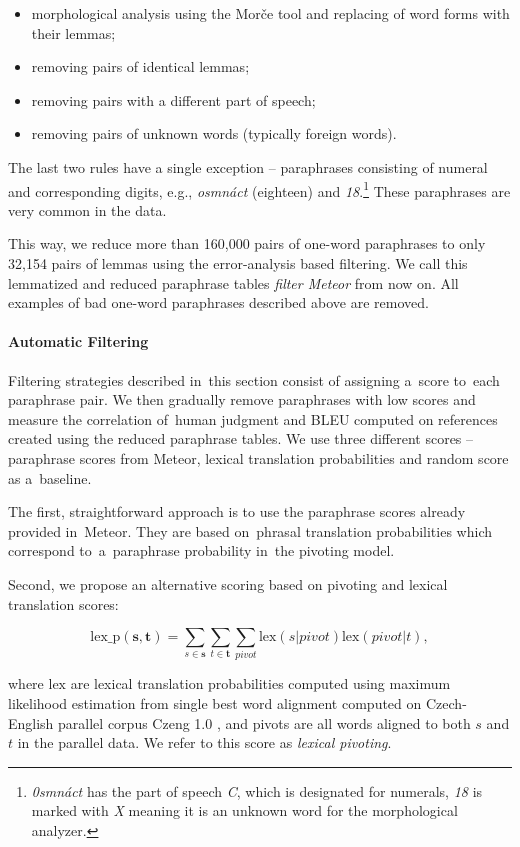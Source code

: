 \begin{itemize}
\item morphological analysis using the Morče tool \citep{morce:2007} and replacing of word forms with their lemmas; 
\item removing pairs of identical lemmas;
\item removing pairs with a different part of speech;
\item removing pairs of unknown words (typically foreign words).
\end{itemize}

The last two rules have a single exception -- paraphrases consisting of numeral and corresponding digits, e.g., \textit{osmnáct} (eighteen) and \textit{18}.\footnote{
\textit{0smnáct} has the part of speech \textit{C}, which is designated for numerals, \textit{18} is marked with \textit{X} meaning it is an unknown word for the morphological analyzer.} 
These paraphrases are very common in the data. 

This way, we reduce more than 160,000 pairs of one-word paraphrases to only 32,154 pairs of lemmas using the error-analysis based filtering. 
We call this lemmatized and reduced paraphrase tables  \emph{filter Meteor} from now on.
All examples of bad one-word paraphrases described above are removed.


\paragraph{Automatic Filtering}
Filtering strategies described in~this section consist of assigning a~score to~each paraphrase pair. 
We then gradually remove paraphrases with low scores and measure the correlation of~human judgment and BLEU computed on references created using the reduced paraphrase tables. 
We use three different scores -- paraphrase scores from Meteor, lexical translation probabilities and random score as a~baseline.

The first, straightforward approach is to use the paraphrase scores already provided in~Meteor. 
They are based on~phrasal translation probabilities which correspond to~a~paraphrase probability in~the pivoting model.

Second, we propose an alternative scoring based on pivoting and lexical translation scores:

$$\text{lex\_p}(\mathbf{s},\mathbf{t}) = \sum_{s \in \mathbf{s}}\sum_{t \in\mathbf{t}}\sum_{pivot}\text{lex}(s|pivot)\text{lex}(pivot|t),$$

where $\text{lex}$ are lexical translation probabilities computed using maximum likelihood estimation from single best word alignment computed on Czech-English parallel corpus Czeng 1.0 \citep{czeng10:lrec2012}, and pivots are all words aligned to both $s$ and $t$ in the parallel data. 
We refer to this score as \emph{lexical pivoting}.

